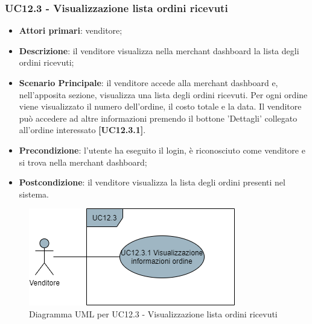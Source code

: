 \subsubsection{UC12.3 - Visualizzazione lista ordini ricevuti}
\begin{itemize}
\item \textbf{Attori primari}: venditore;
\item \textbf{Descrizione}: il venditore visualizza nella merchant dashboard la lista degli ordini ricevuti;
\item \textbf{Scenario Principale}: il venditore accede alla merchant dashboard e, nell'apposita sezione, visualizza una lista degli ordini ricevuti. Per ogni ordine viene visualizzato il numero dell'ordine, il costo totale e la data. Il venditore può accedere ad altre informazioni premendo il bottone 'Dettagli' collegato all'ordine interessato \textbf{[UC12.3.1]}.
\item \textbf{Precondizione}: l'utente ha eseguito il login, è riconosciuto come venditore e si trova nella merchant dashboard;
\item \textbf{Postcondizione}: il venditore visualizza la lista degli ordini presenti nel sistema.
\end{itemize}

\begin{figure}[H]
\centering
\includegraphics[scale=0.6]{res/UseCase/Immagini/VisualizzazioneOrdiniMerchant}
\caption{Diagramma UML per UC12.3 - Visualizzazione lista ordini ricevuti}
\end{figure}

